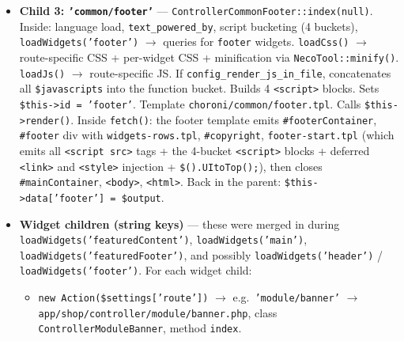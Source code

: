 \documentclass[11pt,a4paper]{article}
\begin{document}
\begin{enumerate}[leftmargin=1.6em,itemsep=2pt]
\begin{itemize}[itemsep=2pt]
                --- no filters registered. Returns the HTML. Back
                in the parent: \texttt{\$this->data['header'] = \$output}.
          \item \textbf{Child 3: \texttt{'common/footer'}} ---
                \texttt{ControllerCommonFooter::index(null)}.
                Inside: language load, \texttt{text\_powered\_by},
                script bucketing (4 buckets),
                \texttt{loadWidgets('footer')} $\to$ queries for
                \texttt{footer} widgets. \texttt{loadCss()} $\to$
                route-specific CSS + per-widget CSS + minification
                via \texttt{NecoTool::minify()}.
                \texttt{loadJs()} $\to$ route-specific JS. If
                \texttt{config\_render\_js\_in\_file}, concatenates
                all \texttt{\$javascripts} into the function
                bucket. Builds 4 \texttt{<script>} blocks. Sets
                \texttt{\$this->id = 'footer'}. Template
                \texttt{choroni/common/footer.tpl}. Calls
                \texttt{\$this->render()}. Inside \texttt{fetch()}:
                the footer template emits \texttt{\#footerContainer},
                \texttt{\#footer} div with
                \texttt{widgets-rows.tpl}, \texttt{\#copyright},
                \texttt{footer-start.tpl} (which emits all
                \texttt{<script src>} tags + the 4-bucket
                \texttt{<script>} blocks + deferred
                \texttt{<link>} and \texttt{<style>} injection +
                \texttt{\$().UItoTop();}), then closes
                \texttt{\#mainContainer}, \texttt{<body>},
                \texttt{<html>}. Back in the parent:
                \texttt{\$this->data['footer'] = \$output}.
          \item \textbf{Widget children (string keys)} --- these
                were merged in during
                \texttt{loadWidgets('featuredContent')},
                \texttt{loadWidgets('main')},
                \texttt{loadWidgets('featuredFooter')}, and
                possibly \texttt{loadWidgets('header')} /
                \texttt{loadWidgets('footer')}. For each widget
                child:
                \begin{itemize}[itemsep=2pt]
                  \item \texttt{new Action(\$settings['route'])}
                        $\to$ e.g.\ \texttt{'module/banner'} $\to$
                        \texttt{app/shop/controller/module/banner.php},
                        class \texttt{ControllerModuleBanner},
                        method \texttt{index}.

\end{itemize}
\end{itemize}
\end{enumerate}
\end{document}
